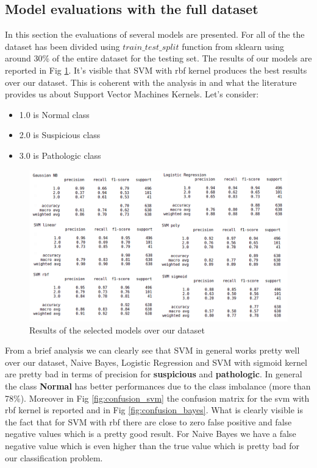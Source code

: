 \documentclass[a4paper,12pt]{article}
\begin{document}
\subsection{Model evaluations with the full dataset}

In this section the evaluations of several models are presented. For all of the the dataset has been divided using $train\_test\_split$ function from sklearn using around 30\% of the entire dataset for the testing set. 
The results of our models are reported in Fig \ref{fig:fulldataset}. It's visible that SVM with rbf kernel produces the best results over our dataset. This is coherent with the analysis in \cite{ml} and what the literature provides us about Support Vector Machines Kernels. Let's consider:
\bigbreak
\begin{itemize}
  \item 1.0 is Normal class
  \item 2.0 is Suspicious class
  \item 3.0 is Pathologic class
\end{itemize} 

\begin{figure}[H]
  \begin{center}
  \includegraphics[width=1.0\textwidth]{images/fulldataset.png}
  \end{center}
  \caption{Results of the selected models over our dataset}
  \label{fig:fulldataset}
\end{figure}

\noindent From a brief analysis we can clearly see that SVM in general works pretty well over our dataset, Naive Bayes, Logistic Regression and SVM with sigmoid kernel are pretty bad in terms of precision for \textbf{suspicious} and \textbf{pathologic}. In general the class \textbf{Normal} has better performances due to the class imbalance (more than 78\%). Moreover in Fig \ref{fig:confusion_svm} the confusion matrix for the svm with rbf kernel is reported and in Fig \ref{fig:confusion_bayes}. What is clearly visible is the fact that for SVM with rbf there are close to zero false positive and false negative values which is a pretty good result. For Naive Bayes we have a false negative value which is even higher than the true value which is pretty bad for our classification problem.
\end{document}
